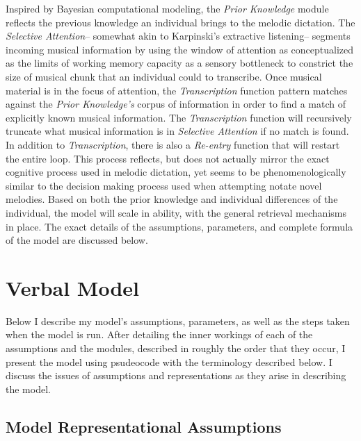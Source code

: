 \documentclass[]{book}
\begin{document}
Inspired by Bayesian computational modeling, the \emph{Prior Knowledge} module reflects the previous knowledge an individual brings to the melodic dictation.
The \emph{Selective Attention}-- somewhat akin to Karpinski's extractive listening-- segments incoming musical information by using the window of attention as conceptualized as the limits of working memory capacity as a sensory bottleneck to constrict the size of musical chunk that an individual could to transcribe.
Once musical material is in the focus of attention, the \emph{Transcription} function pattern matches against the \emph{Prior Knowledge's} corpus of information in order to find a match of explicitly known musical information.
The \emph{Transcription} function will recursively truncate what musical information is in \emph{Selective Attention} if no match is found.
In addition to \emph{Transcription}, there is also a \emph{Re-entry} function that will restart the entire loop.
This process reflects, but does not actually mirror the exact cognitive process used in melodic dictation, yet seems to be phenomenologically similar to the decision making process used when attempting notate novel melodies.
Based on both the prior knowledge and individual differences of the individual, the model will scale in ability, with the general retrieval mechanisms in place.
The exact details of the assumptions, parameters, and complete formula of the model are discussed below.

\hypertarget{verbal-model}{%
\section{Verbal Model}\label{verbal-model}}

Below I describe my model's assumptions, parameters, as well as the steps taken when the model is run.
After detailing the inner workings of each of the assumptions and the modules, described in roughly the order that they occur, I present the model using psudeocode with the terminology described below.
I discuss the issues of assumptions and representations as they arise in describing the model.

\hypertarget{model-representational-assumptions}{%
\subsection{Model Representational Assumptions}\label{model-representational-assumptions}}
\end{document}
